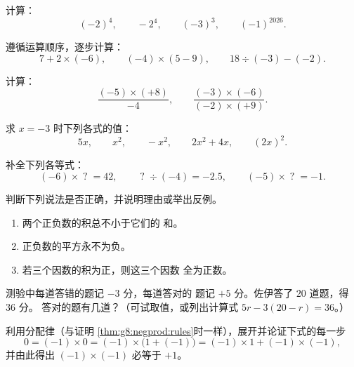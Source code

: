\begin{exercise}[$\star$]\label{exo:g8:negprod:4}
计算：
\[
(-2)^4, \qquad
-2^4, \qquad
(-3)^3, \qquad
(-1)^{2026} .
\]
\end{exercise}

\begin{exercise}[$\star$]\label{exo:g8:negprod:5}
遵循运算顺序，逐步计算：
\[
7 + 2 \times (-6), \qquad
(-4) \times (5 - 9), \qquad
18 \div (-3) - (-2) .
\]
\end{exercise}

\begin{exercise}[$\star$]\label{exo:g8:negprod:6}
计算：
\[
\frac{(-5) \times (+8)}{-4}, \qquad
\frac{(-3) \times (-6)}{(-2) \times (+9)} .
\]
\end{exercise}

\begin{exercise}[$\star$]\label{exo:g8:negprod:7}
求 $x = -3$ 时下列各式的值：
\[
5x, \qquad x^2, \qquad -x^2, \qquad 2x^2 + 4x, \qquad (2x)^2 .
\]
\end{exercise}

\begin{exercise}[$\star\star$]\label{exo:g8:negprod:8}
补全下列各等式：
\[
(-6) \times \;?\; = 42, \qquad
\;?\; \div (-4) = -2.5, \qquad
(-5) \times \;?\; = -1 .
\]
\end{exercise}

\begin{exercise}[$\star\star$]\label{exo:g8:negprod:9}
判断下列说法是否正确，并说明理由或举出反例。
\begin{enumerate}
  \item 两个正负数的积总不小于它们的
        和。
  \item 正负数的平方永不为负。
  \item 若三个因数的积为正，则这三个因数
        全为正数。
\end{enumerate}
\end{exercise}

\begin{exercise}[$\star\star$]\label{exo:g8:negprod:10}
测验中每道答错的题记 $-3$ 分，每道答对的
题记 $+5$ 分。佐伊答了 $20$ 道题，得 $36$ 分。
答对的题有几道？（可试取值，或列出计算式
$5r - 3(20 - r) = 36$。）
\end{exercise}

\begin{exercise}[$\star\star\star$]\label{exo:g8:negprod:11}
利用分配律（与证明
\cref{thm:g8:negprod:rules}时一样），展开并论证下式的每一步
\[
0 = (-1) \times 0 = (-1) \times \bigl(1 + (-1)\bigr)
= (-1) \times 1 + (-1) \times (-1),
\]
并由此得出 $(-1) \times (-1)$ 必等于 $+1$。
\end{exercise}

